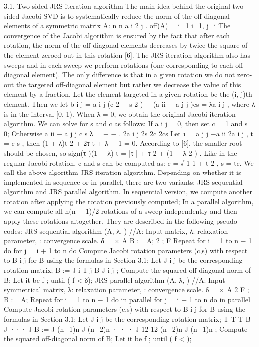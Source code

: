 \documentclass[10pt, conference, compsocconf]{IEEEtran}
\begin{document}
3.1. Two-sided JRS iteration algorithm
The main idea behind the original two-sided Jacobi SVD is
to systematically reduce the norm of the off-diagonal elements
of a symmetric matrix A:
n
n
a i 2 j .
off(A) =
i=1 i=1, j=i
The convergence of the Jacobi algorithm is ensured by the fact
that after each rotation, the norm of the off-diagonal elements
decreases by twice the square of the element zeroed out in this
rotation [6].
The JRS iteration algorithm also has sweeps and in each
sweep we perform rotations (one corresponding to each off-
diagonal element). The only difference is that in a given rotation
we do not zero-out the targeted off-diagonal element but rather
we decrease the value of this element by a fraction.
Let the element targeted in a given rotation be the (i, j)th
element. Then we let
b i j = a i j (c 2 − s 2 ) + (a ii − a j j )cs = λa i j ,
where λ is in the interval [0, 1). When λ = 0, we obtain the
original Jacobi iteration algorithm. We can solve for s and c as
follows: If a i j = 0, then set c = 1 and s = 0; Otherwise
a ii − a j j
c
s
λ
=
−
−
.
2a i j
2s
2c 2cs
Let τ =
a j j −a ii
2a i j
, t = c s , then
(1 + λ)t 2 + 2τ t + λ − 1 = 0.
According to [6], the smaller root should be chosen, so
sign(τ )(1 − λ)
t =
|τ | +
τ 2 + (1 − λ 2 )
.
Like in the regular Jacobi rotation, c and s can be computed as:
c = √
1
1 + t 2
,
s = tc.
We call the above algorithm JRS iteration algorithm.
Depending on whether it is implemented in sequence or in
parallel, there are two variants: JRS sequential algorithm
and JRS parallel algorithm. In sequential version, we
compute another rotation after applying the rotation previously
computed; In a parallel algorithm, we can compute all n(n −
1)/2 rotations of a sweep independently and then apply these
rotations altogether. They are described in the following pseudo
codes:
JRS sequential algorithm (A, λ, )
//A: Input matrix, λ: relaxation parameter, : convergence
scale.
δ = × A
B := A;
2 ;
F
Repeat
{
for i = 1 to n − 1 do
{
for j = i + 1 to n do
{
Compute Jacobi rotation parameters (c,s) with respect
to B i j for B using the formulas in Section 3.1;
Let J i j be the corresponding rotation matrix;
B := J i T j B J i j ;
}
}
Compute the squared off-diagonal norm of B; Let it be f ;
} until ( f < δ);
JRS parallel algorithm (A, λ, )
//A: Input symmetrical matrix, λ: relaxation parameter, :
convergence scale.
δ = × A 2 F ;
B := A;
Repeat
{
for i = 1 to n − 1 do in parallel
{
for j = i + 1 to n do in parallel
{
Compute Jacobi rotation parameters (c,s) with respect
to B i j for B using the formulas in Section 3.1;
Let J i j be the corresponding rotation matrix;
}
}
T
T
T B J ··· J
B := J (n−1)n
J (n−2)n
· · · J 12
12
(n−2)n J (n−1)n ;
Compute the squared off-diagonal norm of B; Let it be f ;
} until ( f < );
\end{document}
